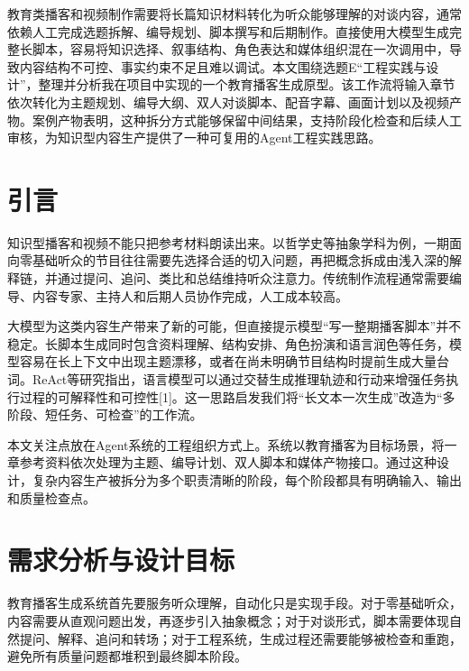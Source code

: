 \documentclass{rjthesis}
\begin{document}
\rjmaketitle

\begin{rjabstract}
教育类播客和视频制作需要将长篇知识材料转化为听众能够理解的对谈内容，通常依赖人工完成选题拆解、编导规划、脚本撰写和后期制作。直接使用大模型生成完整长脚本，容易将知识选择、叙事结构、角色表达和媒体组织混在一次调用中，导致内容结构不可控、事实约束不足且难以调试。本文围绕选题E“工程实践与设计”，整理并分析我在项目中实现的一个教育播客生成原型。该工作流将输入章节依次转化为主题规划、编导大纲、双人对谈脚本、配音字幕、画面计划以及视频产物。案例产物表明，这种拆分方式能够保留中间结果，支持阶段化检查和后续人工审核，为知识型内容生产提供了一种可复用的Agent工程实践思路。
\end{rjabstract}


\section{引言}

知识型播客和视频不能只把参考材料朗读出来。以哲学史等抽象学科为例，一期面向零基础听众的节目往往需要先选择合适的切入问题，再把概念拆成由浅入深的解释链，并通过提问、追问、类比和总结维持听众注意力。传统制作流程通常需要编导、内容专家、主持人和后期人员协作完成，人工成本较高。

大模型为这类内容生产带来了新的可能，但直接提示模型“写一整期播客脚本”并不稳定。长脚本生成同时包含资料理解、结构安排、角色扮演和语言润色等任务，模型容易在长上下文中出现主题漂移，或者在尚未明确节目结构时提前生成大量台词。ReAct等研究指出，语言模型可以通过交替生成推理轨迹和行动来增强任务执行过程的可解释性和可控性[1]。这一思路启发我们将“长文本一次生成”改造为“多阶段、短任务、可检查”的工作流。

本文关注点放在Agent系统的工程组织方式上。系统以教育播客为目标场景，将一章参考资料依次处理为主题、编导计划、双人脚本和媒体产物接口。通过这种设计，复杂内容生产被拆分为多个职责清晰的阶段，每个阶段都具有明确输入、输出和质量检查点。

\section{需求分析与设计目标}

教育播客生成系统首先要服务听众理解，自动化只是实现手段。对于零基础听众，内容需要从直观问题出发，再逐步引入抽象概念；对于对谈形式，脚本需要体现自然提问、解释、追问和转场；对于工程系统，生成过程还需要能够被检查和重跑，避免所有质量问题都堆积到最终脚本阶段。
\end{document}
